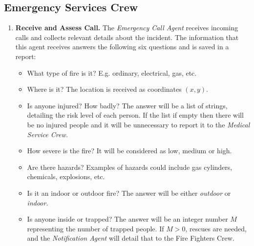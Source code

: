 \subsection{Emergency Services Crew}
\begin{enumerate}

    \item \textbf{Receive and Assess Call.} 
    The \textit{Emergency Call Agent} receives incoming calls and collects relevant details
    about the incident. The information that this agent receives answers the following six questions and is saved
    in a report:
    \begin{itemize}
        \item What type of fire is it? E.g. ordinary, electrical, gas, etc.
        \item Where is it? The location is received as coordinates \((x, y)\).
        \item Is anyone injured? How badly? The answer will be a list of strings, detailing the risk level of each person. If the list 
        if empty then there will be no injured people and it will be unnecessary to report it to the \textit{Medical Service Crew.}
        \item How severe is the fire? It will be considered as low, medium or high.
        \item Are there hazards? Examples of hazards could include gas cylinders, chemicals, explosions, etc.
        \item Is it an indoor or outdoor fire? The answer will be either \textit{outdoor} or \textit{indoor}.
        \item Is anyone inside or trapped? The answer will be an integer number $M$ representing the number of trapped people. 
        If $M > 0$, rescues are needed, and the \textit{Notification Agent} will detail that to the Fire Fighters Crew.
    \end{itemize}
    


\end{enumerate}
